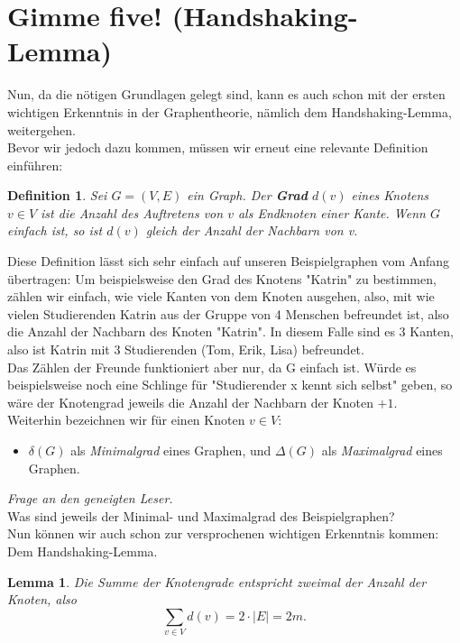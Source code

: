 \documentclass{article}
\newtheorem{definition}{Definition}
\newtheorem{lemma}{Lemma}
\begin{document}
\section{Gimme five! (Handshaking-Lemma)}
Nun, da die nötigen Grundlagen gelegt sind, kann es auch schon mit der ersten wichtigen Erkenntnis in der Graphentheorie, nämlich dem Handshaking-Lemma, weitergehen.\\
\bigskip
Bevor wir jedoch dazu kommen, müssen wir erneut eine relevante Definition einführen:\\
\bigskip
\begin{definition} Sei \(G = (V, E)\) ein Graph. Der \textbf{Grad} \(d(v)\) eines Knotens \(v \in V\) ist die Anzahl des Auftretens von \(v\) als Endknoten einer Kante. Wenn \(G\) einfach ist, so ist \(d(v)\) gleich der Anzahl der Nachbarn von v.
\end{definition}
\bigskip
Diese Definition lässt sich sehr einfach auf unseren Beispielgraphen vom Anfang übertragen: Um beispielsweise den Grad des Knotens "Katrin" zu bestimmen, zählen wir einfach, wie viele Kanten von dem Knoten ausgehen, also, mit wie vielen Studierenden Katrin aus der Gruppe von 4 Menschen befreundet ist, also die Anzahl der Nachbarn des Knoten "Katrin". In diesem Falle sind es \(3\) Kanten, also ist Katrin mit 3 Studierenden (Tom, Erik, Lisa) befreundet.\\
Das Zählen der Freunde funktioniert aber nur, da G einfach ist. Würde es beispielsweise noch eine Schlinge für "Studierender x kennt sich selbst" geben, so wäre der Knotengrad jeweils die Anzahl der Nachbarn der Knoten \(+1\).\\
\bigskip
Weiterhin bezeichnen wir für einen Knoten \(v \in V\):
\begin{itemize}
	\item \(\delta(G)\) als \textit{Minimalgrad} eines Graphen, und
	\ittem \(\Delta(G)\) als \textit{Maximalgrad} eines Graphen.
\end{itemize}
\textit{Frage an den geneigten Leser.}\\
Was sind jeweils der Minimal- und Maximalgrad des Beispielgraphen?\\
\bigskip
Nun können wir auch schon zur versprochenen wichtigen Erkenntnis kommen: Dem Handshaking-Lemma.\\
\begin{lemma}
Die Summe der Knotengrade entspricht zweimal der Anzahl der Knoten, also
\begin{equation*}
	\sum_{v \in V}d(v) = 2 \cdot |E| = 2m.
\end{equation*}
\end{lemma}
\end{document}
